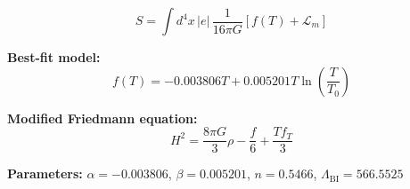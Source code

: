 
\begin{equation}
  S = \int d^4x \, |e| \, \frac{1}{16\pi G} \left[ f(T) + \mathcal{L}_m \right]
\end{equation}

\textbf{Best-fit model:}
\begin{equation}
  f(T) = -0.003806 T + 0.005201 T \ln\!\left(\frac{T}{T_0}\right)
\end{equation}

\textbf{Modified Friedmann equation:}
\begin{equation}
  H^2 = \frac{8\pi G}{3} \rho - \frac{f}{6} + \frac{T f_T}{3}
\end{equation}

\textbf{Parameters:}
$\alpha = -0.003806$, \quad
$\beta = 0.005201$, \quad
$n = 0.5466$, \quad
$\Lambda_{\text{BI}} = 566.5525$